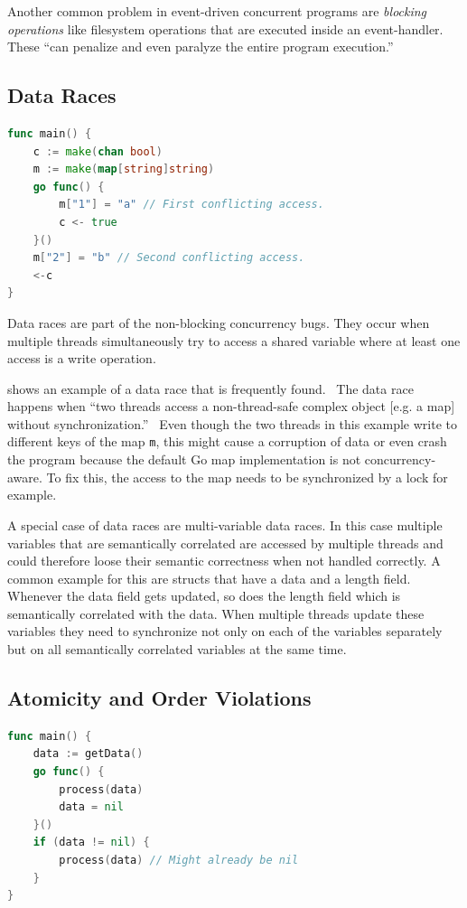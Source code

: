 \documentclass[conference]{IEEEtran}
\begin{document}
Another common problem in event-driven concurrent programs are \emph{blocking operations} like filesystem operations that are executed inside an event-handler.
These ``can penalize and even paralyze the entire program execution.''~\cite{tchamgoue2012testing}

\subsection{Data Races}
\begin{lstlisting}[float=h, language=Go, label=lst:race, caption=Data race -- based on \cite{goRaceDetector}]
func main() {
	c := make(chan bool)
	m := make(map[string]string)
	go func() {
		m["1"] = "a" // First conflicting access.
		c <- true
	}()
	m["2"] = "b" // Second conflicting access.
	<-c
}
\end{lstlisting}

Data races are part of the non-blocking concurrency bugs.
They occur when multiple threads simultaneously try to access a shared variable where at least one access is a write operation.~\cite{serebry2009threadsanitizer}

 shows an example of a data race that is frequently found.~\cite{serebry2009threadsanitizer}
The data race happens when ``two threads access a non-thread-safe complex object [e.g. a map] without synchronization.''~\cite{serebry2009threadsanitizer}
Even though the two threads in this example write to different keys of the map \lstinline{m}, this might cause a corruption of data or even crash the program because the default Go map implementation is not concurrency-aware.
To fix this, the access to the map needs to be synchronized by a lock for example.

A special case of data races are multi-variable data races.
In this case multiple variables that are semantically correlated are accessed by multiple threads and could therefore loose their semantic correctness when not handled correctly.
A common example for this are structs that have a data and a length field.
Whenever the data field gets updated, so does the length field which is semantically correlated with the data.
When multiple threads update these variables they need to synchronize not only on each of the variables separately but on all semantically correlated variables at the same time.~\cite{lu2007muvi}

\subsection{Atomicity and Order Violations}
\begin{lstlisting}[float=h, language=Go, label=lst:order, caption=Test-and-Use bug pattern -- Order violation]
func main() {
    data := getData()
    go func() {
        process(data)
        data = nil
    }()
    if (data != nil) {
        process(data) // Might already be nil
    }
}
\end{lstlisting}
\end{document}
